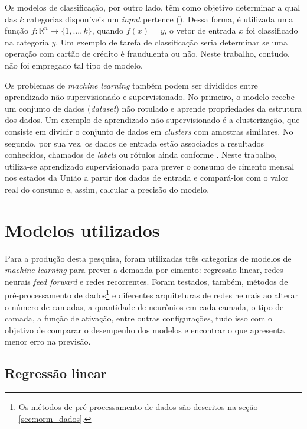 Os modelos de classificação, por outro lado, têm como objetivo 
determinar a qual das $k$ categorias disponíveis um 
\textit{input} pertence (\cite{dl-oreilly}). Dessa forma, é utilizada uma função  
$ f : \mathbb{R}^n \rightarrow \{1,...,k\}$, quando 
$ f(x) = y$, o vetor de entrada $x$ foi classificado 
na categoria $y$. Um exemplo de tarefa de classificação
seria determinar se uma operação com cartão de crédito 
é fraudulenta ou não. Neste trabalho, contudo, não foi empregado 
tal tipo de modelo. 

Os problemas de 
\textit{machine learning} também podem ser divididos entre
aprendizado não-supervisionado e supervisionado. No primeiro, 
o modelo recebe um conjunto de dados (\textit{dataset}) não 
rotulado e aprende propriedades da estrutura dos dados. 
Um exemplo de aprendizado não supervisionado é a clusterização,
que consiste em dividir o conjunto de dados
em \textit{clusters} com amostras similares. No segundo, por sua vez, 
os dados de entrada estão associados a resultados conhecidos, 
chamados de \textit{labels} ou rótulos ainda conforme \citet{Goodfellow-et-al-2016}. Neste trabalho, utiliza-se aprendizado 
supervisionado para prever o consumo de cimento mensal nos 
estados da União a partir dos dados de entrada e compará-los 
com o valor real 
do consumo e, assim, calcular a precisão do modelo.

\section{Modelos utilizados}

Para a produção desta pesquisa, foram utilizadas três categorias de modelos de \textit{machine learning} para prever a demanda por cimento: regressão linear, redes
neurais \textit{feed forward} e redes recorrentes. Foram testados, também,
 métodos de pré-processamento de dados\footnote{Os métodos de pré-processamento de dados são descritos na seção \ref{sec:norm_dados}.} e  diferentes arquiteturas de 
redes neurais ao alterar o número de camadas, a quantidade de neurônios
em cada camada, o tipo de camada, a função de ativação, entre outras
configurações, tudo isso com o objetivo de comparar 
o desempenho dos modelos e encontrar o que apresenta menor erro na previsão.

\subsection{Regressão linear}
\label{sec:reg_lin}

